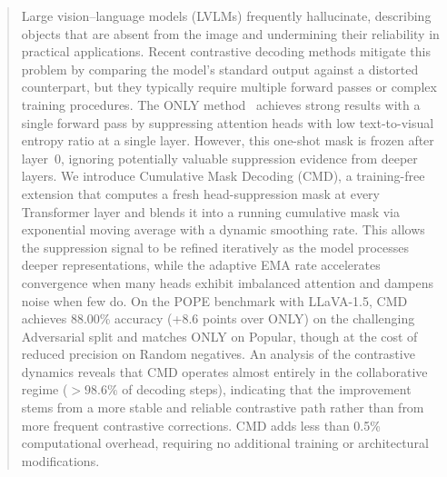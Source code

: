 \begin{abstract}
Large vision--language models (LVLMs) frequently hallucinate, describing objects that are absent from the image and undermining their reliability in practical applications. Recent contrastive decoding methods mitigate this problem by comparing the model's standard output against a distorted counterpart, but they typically require multiple forward passes or complex training procedures. The ONLY method~\cite{wan2025only} achieves strong results with a single forward pass by suppressing attention heads with low text-to-visual entropy ratio at a single layer. However, this one-shot mask is frozen after layer~0, ignoring potentially valuable suppression evidence from deeper layers. We introduce Cumulative Mask Decoding (CMD), a training-free extension that computes a fresh head-suppression mask at every Transformer layer and blends it into a running cumulative mask via exponential moving average with a dynamic smoothing rate. This allows the suppression signal to be refined iteratively as the model processes deeper representations, while the adaptive EMA rate accelerates convergence when many heads exhibit imbalanced attention and dampens noise when few do. On the POPE benchmark with LLaVA-1.5, CMD achieves 88.00\% accuracy (+8.6 points over ONLY) on the challenging Adversarial split and matches ONLY on Popular, though at the cost of reduced precision on Random negatives. An analysis of the contrastive dynamics reveals that CMD operates almost entirely in the collaborative regime ($>98.6\%$ of decoding steps), indicating that the improvement stems from a more stable and reliable contrastive path rather than from more frequent contrastive corrections. CMD adds less than 0.5\% computational overhead, requiring no additional training or architectural modifications.
\end{abstract}